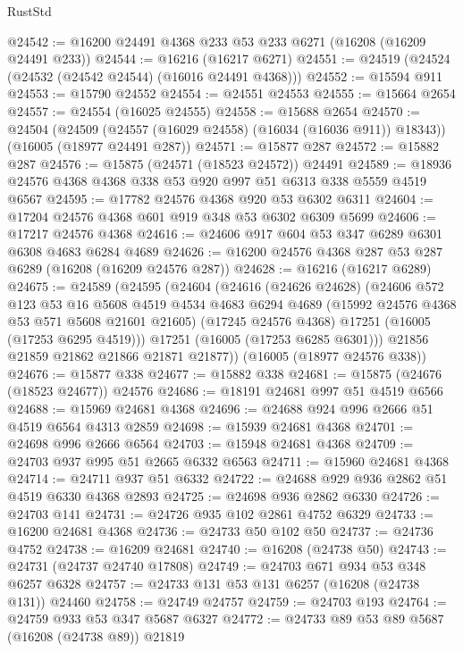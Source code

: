 \begin{lexlean}{RustStd}
\begin{coremodule}
@24542 := @16200 @24491 @4368 @233 @53 @233 @6271 (@16208 (@16209 @24491 @233))
@24544 := @16216 (@16217 @6271)
@24551 := @24519 (@24524 (@24532 (@24542 @24544) (@16016 @24491 @4368)))
@24552 := @15594 @911
@24553 := @15790 @24552
@24554 := @24551 @24553
@24555 := @15664 @2654
@24557 := @24554 (@16025 @24555)
@24558 := @15688 @2654
@24570 := @24504
    (@24509 (@24557 (@16029 @24558) (@16034 (@16036 @911)) @18343))
    (@16005 (@18977 @24491 @287))
@24571 := @15877 @287
@24572 := @15882 @287
@24576 := @15875 (@24571 (@18523 @24572)) @24491
@24589 := @18936 @24576 @4368 @4368 @338 @53 @920 @997 @51 @6313 @338 @5559 @4519 @6567
@24595 := @17782 @24576 @4368 @920 @53 @6302 @6311
@24604 := @17204 @24576 @4368 @601 @919 @348 @53 @6302 @6309 @5699
@24606 := @17217 @24576 @4368
@24616 := @24606 @917 @604 @53 @347 @6289 @6301 @6308 @4683 @6284 @4689
@24626 := @16200 @24576 @4368 @287 @53 @287 @6289 (@16208 (@16209 @24576 @287))
@24628 := @16216 (@16217 @6289)
@24675 := @24589
    (@24595
      (@24604
        (@24616
          (@24626 @24628)
          (@24606
            @572
            @123
            @53
            @16
            @5608
            @4519
            @4534
            @4683
            @6294
            @4689
            (@15992 @24576 @4368 @53 @571 @5608 @21601 @21605)
            (@17245 @24576 @4368)
            @17251
            (@16005 (@17253 @6295 @4519)))
          @17251
          (@16005 (@17253 @6285 @6301)))
        @21856
        @21859
        @21862
        @21866
        @21871
        @21877))
    (@16005 (@18977 @24576 @338))
@24676 := @15877 @338
@24677 := @15882 @338
@24681 := @15875 (@24676 (@18523 @24677)) @24576
@24686 := @18191 @24681 @997 @51 @4519 @6566
@24688 := @15969 @24681 @4368
@24696 := @24688 @924 @996 @2666 @51 @4519 @6564 @4313 @2859
@24698 := @15939 @24681 @4368
@24701 := @24698 @996 @2666 @6564
@24703 := @15948 @24681 @4368
@24709 := @24703 @937 @995 @51 @2665 @6332 @6563
@24711 := @15960 @24681 @4368
@24714 := @24711 @937 @51 @6332
@24722 := @24688 @929 @936 @2862 @51 @4519 @6330 @4368 @2893
@24725 := @24698 @936 @2862 @6330
@24726 := @24703 @141
@24731 := @24726 @935 @102 @2861 @4752 @6329
@24733 := @16200 @24681 @4368
@24736 := @24733 @50 @102 @50
@24737 := @24736 @4752
@24738 := @16209 @24681
@24740 := @16208 (@24738 @50)
@24743 := @24731 (@24737 @24740 @17808)
@24749 := @24703 @671 @934 @53 @348 @6257 @6328
@24757 := @24733 @131 @53 @131 @6257 (@16208 (@24738 @131)) @24460
@24758 := @24749 @24757
@24759 := @24703 @193
@24764 := @24759 @933 @53 @347 @5687 @6327
@24772 := @24733 @89 @53 @89 @5687 (@16208 (@24738 @89)) @21819

\end{coremodule}
\end{lexlean}
